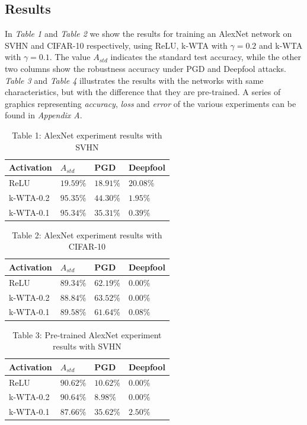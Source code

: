 \documentclass[a4paper]{article}
\begin{document}
	\subsection{Results}
	In \textit{Table 1} and \textit{Table 2} we show the results for training an AlexNet network on SVHN and CIFAR-10 respectively, using ReLU, k-WTA with $\gamma = 0.2$ and k-WTA with $\gamma = 0.1$. The value $A_{std}$ indicates the standard test accuracy, while the other two columns show the robustness accuracy under PGD and Deepfool attacks. \textit{Table 3} and \textit{Table 4} illustrates the results with the networks with same characteristics, but with the difference that they are pre-trained.
	A series of graphics representing \emph{accuracy}, \emph{loss} and \emph{error} of the various experiments can be found in \emph{Appendix A}.
	\begin{table}[!htbp]
		\begin{tabular}{|p{}|p{}|p{}|p{}|}
			\hline
			Activation	& $A_{std}$	&	PGD	&	Deepfool	\\
			\hline
			ReLU		&$19.59\%$&$18.91\%$&$20.08\%$	\\
			\hline
			k-WTA-0.2	&$95.35\%$&$44.30\%$&$1.95\%$	\\
			\hline
			k-WTA-0.1	&$95.34\%$&$35.31\%$&$0.39\%$	\\
			\hline
		\end{tabular}
		\caption{Table 1: AlexNet experiment results with SVHN}\label{alexnetSVHN}
	\end{table}
	\begin{table}[!htbp]
		\begin{tabular}{|p{}|p{}|p{}|p{}|}
			\hline
			Activation	& $A_{std}$	&	PGD	&	Deepfool	\\
			\hline
			ReLU		&$89.34\%$&$62.19\%$&$0.00\%$	\\
			\hline
			k-WTA-0.2	&$88.84\%$&$63.52\%$&$0.00\%$	\\
			\hline
			k-WTA-0.1	&$89.58\%$&$61.64\%$&$0.08\%$	\\
			\hline
		\end{tabular}
		\caption{Table 2: AlexNet experiment results with CIFAR-10}\label{alexnetCIFAR10}
	\end{table}
	\begin{table}[!htbp]
		\begin{tabular}{|p{}|p{}|p{}|p{}|}
			\hline
			Activation	& $A_{std}$	&	PGD	&	Deepfool	\\
			\hline
			ReLU		&$90.62\%$&$10.62\%$&$0.00\%$	\\
			\hline
			k-WTA-0.2	&$90.64\%$&$8.98\%$&$0.00\%$	\\
			\hline
			k-WTA-0.1	&$87.66\%$&$35.62\%$&$2.50\%$	\\
			\hline
		\end{tabular}
		\caption{Table 3: Pre-trained AlexNet experiment results with SVHN}\label{pre-alexnetSVHN}
	\end{table}
\end{document}
